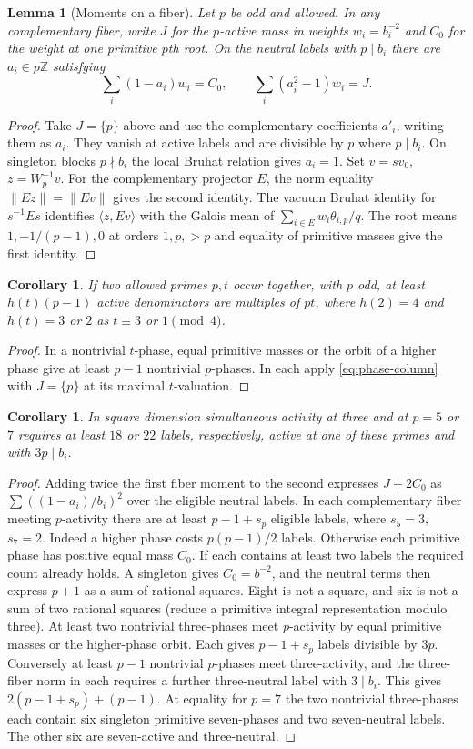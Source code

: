 \documentclass[11pt]{amsart}
\numberwithin{equation}{section}
\newtheorem{lemma}[theorem]{Lemma}
\newtheorem{corollary}[theorem]{Corollary}
\theoremstyle{definition}
\theoremstyle{plain}
\newcommand{\ZZ}{\mathbb Z}
\begin{document}
\begin{lemma}[Moments on a fiber]
Let $p$ be odd and allowed. In any complementary fiber, write $J$
for the $p$-active mass in weights $w_i=b_i^{-2}$ and $C_0$ for
the weight at one primitive $p$th root. On the neutral labels with
$p\mid b_i$ there are $a_i\in p\ZZ$ satisfying
\[
 \sum_i(1-a_i)w_i=C_0,\qquad\sum_i(a_i^2-1)w_i=J.
\]
\end{lemma}
\begin{proof}
Take $J=\{p\}$ above and use the complementary coefficients $a'_i$,
writing them as $a_i$. They vanish at active labels and are divisible
by $p$ where $p\mid b_i$. On singleton blocks $p\nmid b_i$ the
local Bruhat relation gives $a_i=1$. Set $v=sv_0$, $z=W_p^{-1}v$.
For the complementary projector $E$, the norm equality
$\|Ez\|=\|Ev\|$ gives the second identity. The vacuum Bruhat
identity for $s^{-1}Es$ identifies $\langle z,Ev\rangle$
with the Galois mean of $\sum_{i\in E}w_i\theta_{i,p}/q$.
The root means $1,-1/(p-1),0$ at orders $1,p,>p$ and equality
of primitive masses give the first identity.
\end{proof}
\begin{corollary}\label{result:mixed}
If two allowed primes $p,t$ occur together, with $p$ odd, at least
$h(t)(p-1)$ active denominators are multiples of $pt$, where $h(2)=4$
and $h(t)=3$ or $2$ as $t\equiv3$ or $1\pmod4$. 
\end{corollary}
\begin{proof}
In a nontrivial $t$-phase, equal primitive masses or the orbit of a
higher phase give at least $p-1$ nontrivial $p$-phases. In each
apply \eqref{eq:phase-column} with $J=\{p\}$ at its maximal
$t$-valuation.
\end{proof}
\begin{corollary}\label{result:fiber-squares}
In square dimension simultaneous activity at three and at $p=5$ or
$7$ requires at least $18$ or $22$ labels, respectively, active at
one of these primes and with $3p\mid b_i$.
\end{corollary}
\begin{proof}
Adding twice the first fiber moment to the second expresses $J+2C_0$
as $\sum((1-a_i)/b_i)^2$ over the eligible neutral labels.
In each complementary fiber meeting $p$-activity there are at least $p-1+s_p$ eligible
labels, where $s_5=3$, $s_7=2$. Indeed a higher phase costs
$p(p-1)/2$ labels. Otherwise each primitive phase has positive equal
mass $C_0$. If each contains at least two labels the required count
already holds. A singleton gives $C_0=b^{-2}$, and the neutral
terms then express $p+1$ as a sum of rational squares. Eight is
not a square, and six is not a sum of two rational squares
(reduce a primitive integral representation modulo three).
At least two nontrivial three-phases meet $p$-activity by equal
primitive masses or the higher-phase orbit. Each gives $p-1+s_p$
labels divisible by $3p$. Conversely at least $p-1$ nontrivial
$p$-phases meet three-activity, and the three-fiber norm in each
requires a further three-neutral label with $3\mid b_i$. This gives
$2(p-1+s_p)+(p-1)$. At equality for $p=7$ the two nontrivial
three-phases each contain six singleton primitive seven-phases and
two seven-neutral labels. The other six are seven-active and three-neutral.
\end{proof}
\end{document}
